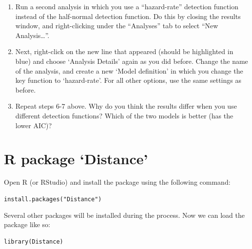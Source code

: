 \documentclass[12pt]{article}\usepackage[]{graphicx}\usepackage[]{color}
\makeatletter
\newcommand{\hlstr}[1]{\textcolor[rgb]{0.749,0.012,0.012}{#1}}%
\newcommand{\hlstd}[1]{\textcolor[rgb]{0,0,0}{#1}}%
\newcommand{\hlkwd}[1]{\textcolor[rgb]{0.004,0.004,0.506}{#1}}%
\newenvironment{kframe}{%
 \def\at@end@of@kframe{}%
 \ifinner\ifhmode%
  \def\at@end@of@kframe{\end{minipage}}%
  \begin{minipage}{\columnwidth}%
 \fi\fi%
 \def\FrameCommand##1{\hskip\@totalleftmargin \hskip-\fboxsep
 \colorbox{shadecolor}{##1}\hskip-\fboxsep
     \hskip-\linewidth \hskip-\@totalleftmargin \hskip\columnwidth}%
 \MakeFramed {\advance\hsize-\width
   \@totalleftmargin\z@ \linewidth\hsize
   \@setminipage}}%
 {\par\unskip\endMakeFramed%
 \at@end@of@kframe}
\newenvironment{knitrout}{}{} %
\makeatother
\begin{document}
\begin{enumerate}
  \item Run a second analysis in which you use a ``hazard-rate''
    detection function instead of the half-normal detection
    function. Do this by closing the results window, and
    right-clicking under the ``Analyses'' tab to select ``New Analysis\dots''.  
  \item Next, right-click on the new line that appeared (should be
    highlighted in blue) and choose `Analysis Details' again as you
    did before. Change the name of the analysis, and create a new
    `Model definition' in which you change the key function to
    `hazard-rate'. For all other options, use the same settings as
    before.   
  \item Repeat steps 6-7 above. Why do you think the results differ
    when you use different detection functions? Which of the two
    models is better (has the lower AIC)?  
\end{enumerate}


\clearpage


\section*{R package `Distance'}

Open R (or RStudio) and install the package using the following
command: 

\begin{knitrout}
\color{fgcolor}\begin{kframe}
\begin{alltt}
\hlkwd{install.packages}\hlstd{(}\hlstr{"Distance"}\hlstd{)}
\end{alltt}
\end{kframe}
\end{knitrout}

Several other packages will be installed during the process. Now we
can load the package like so: 

\begin{knitrout}
\color{fgcolor}\begin{kframe}
\begin{alltt}
\hlkwd{library}\hlstd{(Distance)}
\end{alltt}


{\ttfamily\noindent\itshape\color{messagecolor}{\#\# Loading required package: mrds}}

{\ttfamily\noindent\itshape\color{messagecolor}{\#\# This is mrds 2.2.3\\\#\# Built: R 4.0.3; ; 2020-10-17 13:10:23 UTC; unix}}

{\ttfamily\noindent\itshape\color{messagecolor}{\#\# \\\#\# Attaching package: 'Distance'}}

{\ttfamily\noindent\itshape\color{messagecolor}{\#\# The following object is masked from 'package:mrds':\\\#\# \\\#\#\ \ \ \  create.bins}}\end{kframe}
\end{knitrout}
\end{document}
